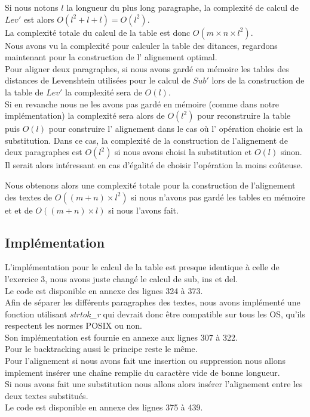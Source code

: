 \documentclass{article}
\begin{document}
Si nous notons $l$ la longueur du plus long paragraphe, la complexité de calcul
de $Lev'$ est alors $O(l^2+l+l) = O(l^2)$.\\
La complexité totale du calcul de la table est donc $O(m \times n \times l^2)$.\\

Nous avons vu la complexité pour calculer la table des ditances, regardons
maintenant pour la construction de l' alignement optimal.\\
Pour aligner deux paragraphes, si nous avons gardé en mémoire les tables des
distances de Levenshtein utilisées pour le calcul de $Sub'$ lors de la
construction de la table de $Lev'$ la complexité sera de $O(l)$.\\
Si en revanche nous ne les avons pas gardé en mémoire (comme dans notre
implémentation) la complexité sera alors de $O(l^2)$ pour reconstruire la table
puis $O(l)$ pour construire l' alignement dans le cas où l' opération choisie
est la substitution. Dans ce cas, la complexité de la construction de
l'alignement de deux paragraphes est $O(l^2)$ si nous avons choisi la
substitution et $O(l)$ sinon. Il serait alors intéressant en cas d'égalité de
choisir l'opération la moins coûteuse.

Nous obtenons alors une complexité totale pour la construction de l'alignement 
des textes de $O((m+n)\times l^2)$ si nous n'avons pas gardé les tables en
mémoire et et de $O((m+n)\times l)$ si nous l'avons fait.


\subsection{Implémentation}

L'implémentation pour le calcul de la table est presque identique à celle de
l'exercice 3, nous avons juste changé le calcul de sub, ins et del.\\
Le code est disponible en annexe des lignes 324 à 373.\\
Afin de séparer les différents paragraphes des textes, nous avons implémenté
une fonction utilisant \textit{strtok\_r} qui devrait donc être compatible sur tous les
OS, qu'ils respectent les normes POSIX ou non.\\
Son implémentation est fournie en annexe aux lignes 307 à 322.\\

Pour le backtracking aussi le principe reste le même.\\
Pour l'alignement si nous avons fait une insertion ou suppression nous allons
implement insérer une chaîne remplie du caractère vide de bonne longueur.\\
Si nous avons fait une substitution nous allons alors insérer l'alignement
entre les deux textes substitués.\\
Le code est disponible en annexe des lignes 375 à 439.\\
\end{document}
